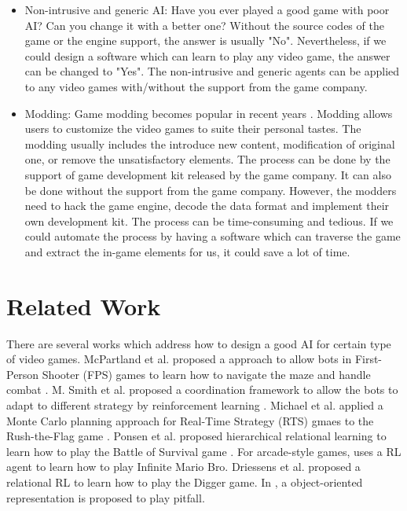 \begin{itemize}{}
\item Non-intrusive and generic AI:
Have you ever played a good game with poor AI? Can you change it with a better one?
Without the source codes of the game or the engine support, the answer is usually "No".
Nevertheless, if we could design a software which can learn to play any video game, 
the answer can be changed to "Yes". The non-intrusive and generic agents can be 
applied to any video games with/without the support from the game company.

\item Modding: 
Game modding becomes popular in recent years \cite{Modding}. 
Modding allows users to customize the video games to suite their personal tastes.
The modding usually includes the introduce new content, modification of original one, or remove the unsatisfactory elements.
The process can be done by the support of game development kit released by the game company.
It can also be done without the support from the game company. However, the modders need to hack the game engine,
decode the data format and implement their own development kit. 
The process can be time-consuming and tedious.
If we could automate the process by having a software which can 
traverse the game and extract the in-game elements for us, it could save a lot of time.

\end{itemize}

\section{Related Work}

There are several works which address how to design a good AI for certain type of video games.
McPartland et al. proposed a approach to allow bots in First-Person Shooter (FPS)
games to learn how to navigate the maze and handle combat \cite{FPS}. M. Smith et al. proposed a coordination 
framework to allow the bots to adapt to different strategy by reinforcement learning \cite{FPS_TEAM}. 
Michael et al. applied a Monte Carlo planning approach for Real-Time Strategy (RTS) gmaes to 
the Rush-the-Flag game \cite{RTS}. Ponsen et al. proposed hierarchical relational learning to learn how to play
the Battle of Survival game \cite{HRRL}. For arcade-style games, \cite{Mario} uses a RL agent to learn
how to play Infinite Mario Bro. Driessens et al. proposed a relational RL to learn how to play the Digger
game. In \cite{OO}, a object-oriented representation is proposed to play pitfall.

